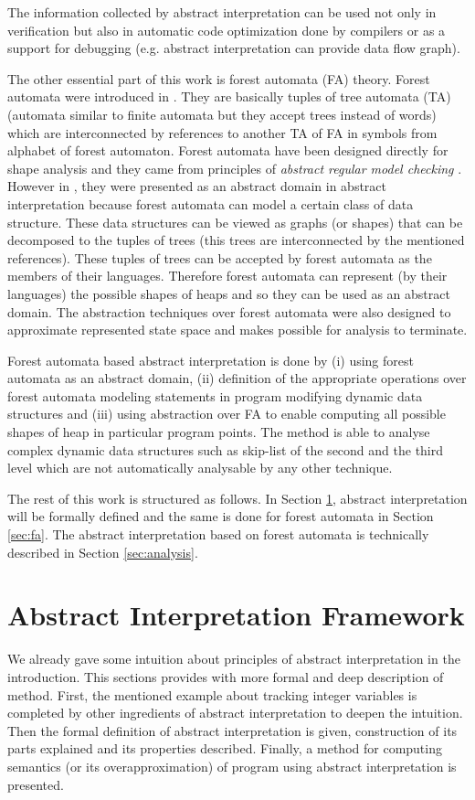\documentclass[a4paper, 12pt]{article}
\begin{document}
The information collected by abstract interpretation can be used not only
in verification but also in automatic code optimization done by compilers
or as a support for debugging (e.g. abstract interpretation can provide data flow graph).

The other essential part of this work is forest automata (FA) theory.
Forest automata were introduced in \cite{cav11}.
They are basically tuples of tree automata (TA) (automata similar to finite automata
but they accept trees instead of words) which are interconnected
by references to another TA of FA in symbols from alphabet of forest automaton.
Forest automata have been designed directly for shape analysis and
they came from principles of \emph{abstract regular model checking} \cite{artmc}.
However in \cite{atva13}, they were presented as an abstract domain in abstract interpretation
because forest automata can model a certain class of data structure.
These data structures can be viewed as graphs (or shapes) that can be decomposed to the tuples
of trees (this trees are interconnected by the mentioned references).
These tuples of trees can be accepted by forest automata as the members of their languages.
Therefore forest automata can represent (by their languages) the possible shapes of heaps
and so they can be used as an abstract domain.
The abstraction techniques over forest automata were also designed
to approximate represented state space and makes possible for analysis to terminate.

Forest automata based abstract interpretation is done by (i) using
forest automata as an abstract domain, (ii) definition of the appropriate
operations over forest automata modeling statements in program
modifying dynamic data structures and (iii) using abstraction over FA
to enable computing all possible shapes of heap in particular
program points.
The method is able to analyse complex dynamic data structures
such as skip-list of the second and the third level which are not
automatically analysable by any other technique.

The rest of this work is structured as follows.
In Section \ref{sec:aif}, abstract interpretation will
be formally defined and the same is done for forest automata
in Section \ref{sec:fa}.
The abstract interpretation based on forest automata is technically
described in Section \ref{sec:analysis}.

\section{Abstract Interpretation Framework}
\label{sec:aif}
We already gave some intuition about principles of abstract interpretation in the introduction.
This sections provides with more formal and deep description of method.
First, the mentioned example about tracking integer variables is completed by
other ingredients of abstract interpretation to deepen the intuition.
Then the formal definition of abstract interpretation is given, construction of its parts
explained and its properties described.
Finally, a method for computing semantics (or its overapproximation) of program
using abstract interpretation is presented.
\end{document}
